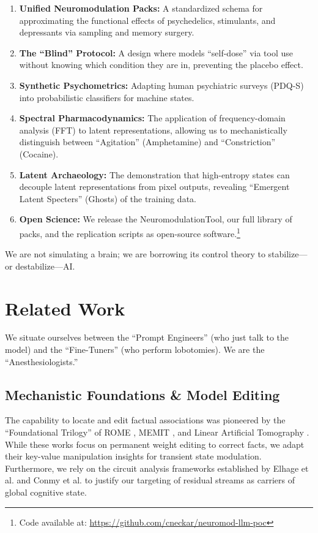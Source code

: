 \documentclass[10pt, twocolumn]{article}
\begin{document}
\begin{enumerate}
    \item \textbf{Unified Neuromodulation Packs:} A standardized schema for approximating the functional effects of psychedelics, stimulants, and depressants via sampling and memory surgery.
    \item \textbf{The ``Blind'' Protocol:} A design where models ``self-dose'' via tool use without knowing which condition they are in, preventing the placebo effect.
    \item \textbf{Synthetic Psychometrics:} Adapting human psychiatric surveys (PDQ-S) into probabilistic classifiers for machine states.
    \item \textbf{Spectral Pharmacodynamics:} The application of frequency-domain analysis (FFT) to latent representations, allowing us to mechanistically distinguish between ``Agitation'' (Amphetamine) and ``Constriction'' (Cocaine).
    \item \textbf{Latent Archaeology:} The demonstration that high-entropy states can decouple latent representations from pixel outputs, revealing ``Emergent Latent Specters'' (Ghosts) of the training data.
    \item \textbf{Open Science:} We release the NeuromodulationTool, our full library of packs, and the replication scripts as open-source software.\footnote{Code available at: \url{https://github.com/cneckar/neuromod-llm-poc}}
\end{enumerate}

We are not simulating a brain; we are borrowing its control theory to stabilize—or destabilize—AI.

\section{Related Work}

We situate ourselves between the ``Prompt Engineers'' (who just talk to the model) and the ``Fine-Tuners'' (who perform lobotomies). We are the ``Anesthesiologists.''

\subsection{Mechanistic Foundations \& Model Editing}
The capability to locate and edit factual associations was pioneered by the ``Foundational Trilogy'' of ROME \cite{meng2022}, MEMIT \cite{meng2023}, and Linear Artificial Tomography \cite{hernandez2023}. While these works focus on permanent weight editing to correct facts, we adapt their key-value manipulation insights for transient state modulation. Furthermore, we rely on the circuit analysis frameworks established by Elhage et al. \cite{elhage2021} and Conmy et al. \cite{conmy2023} to justify our targeting of residual streams as carriers of global cognitive state.
\end{document}
